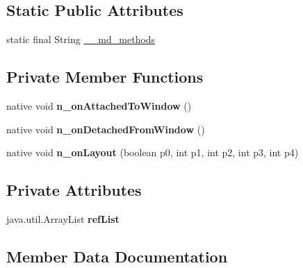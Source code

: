 \subsection*{Static Public Attributes}
\begin{DoxyCompactItemize}
\item 
static final String \hyperlink{classmd5b60ffeb829f638581ab2bb9b1a7f4f3f_1_1NavigationRenderer_a6f16e4bf9cbed6430832e41a4d1bd118}{\+\_\+\+\_\+md\+\_\+methods}
\end{DoxyCompactItemize}
\subsection*{Private Member Functions}
\begin{DoxyCompactItemize}
\item 
\mbox{\label{classmd5b60ffeb829f638581ab2bb9b1a7f4f3f_1_1NavigationRenderer_a77794e91c573098800a84c804674bdd5}} 
native void {\bfseries n\+\_\+on\+Attached\+To\+Window} ()
\item 
\mbox{\label{classmd5b60ffeb829f638581ab2bb9b1a7f4f3f_1_1NavigationRenderer_aaae9bf07ad0aa59b17ac51722f2d0f2c}} 
native void {\bfseries n\+\_\+on\+Detached\+From\+Window} ()
\item 
\mbox{\label{classmd5b60ffeb829f638581ab2bb9b1a7f4f3f_1_1NavigationRenderer_aaf33a2356cdc5ae5ab47a5c443433d3b}} 
native void {\bfseries n\+\_\+on\+Layout} (boolean p0, int p1, int p2, int p3, int p4)
\end{DoxyCompactItemize}
\subsection*{Private Attributes}
\begin{DoxyCompactItemize}
\item 
\mbox{\label{classmd5b60ffeb829f638581ab2bb9b1a7f4f3f_1_1NavigationRenderer_a34e14358e96ac8045a51c49c123a8e3e}} 
java.\+util.\+Array\+List {\bfseries ref\+List}
\end{DoxyCompactItemize}


\subsection{Member Data Documentation}
\mbox{\label{classmd5b60ffeb829f638581ab2bb9b1a7f4f3f_1_1NavigationRenderer_a6f16e4bf9cbed6430832e41a4d1bd118}} 
